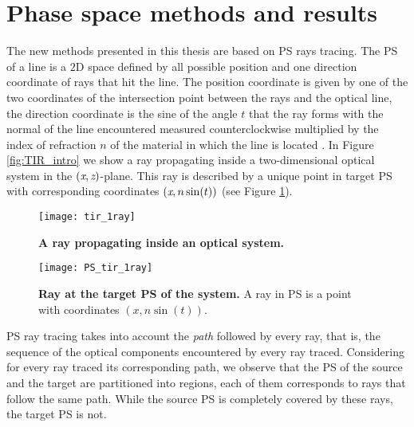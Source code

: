 \section{Phase space methods and results}
The new methods presented in this thesis are based on PS rays tracing. The PS of a line is a $2$D space defined by all possible position and one direction coordinate of rays that hit the line. 
The position coordinate is given by one of the two coordinates of the intersection point between the rays and the optical line, the direction coordinate is the sine of the angle $t$ that the ray forms with the normal of the line encountered measured counterclockwise multiplied by the index of refraction $n$ of the material in which the line is located \cite{wolf2004geometric}. In Figure \ref{fig:TIR_intro} we show a ray propagating inside a two-dimensional optical system in the $(\textit{x}, \textit{z})$-plane. This ray is described by a unique point in target PS with corresponding coordinates $(\textit{x}, n\sin(t))$ (see Figure \ref{fig:PS_intro}).
\begin{figure}[t]
  \begin{minipage}[t]{0.49\textwidth}
    \texttt{[image: tir\_1ray]}
    \caption{\textbf{A ray propagating inside an optical system.}}
    \label{fig:TIR_intro}
  \end{minipage}
\hfill
  \begin{minipage}[t]{0.49\textwidth}
    \texttt{[image: PS\_tir\_1ray]}
  \caption{\textbf{Ray at the target PS of the system.} A ray in PS is a point with coordinates $(x, n\sin(t))$.}
\label{fig:PS_intro}
 \end{minipage}
\end{figure}
PS ray tracing takes into account the \textit{path} followed by every ray, that is, the sequence of the optical components encountered by every ray traced.
Considering for every ray traced its corresponding path, we observe that the PS of the source and the target are partitioned into regions, each of them corresponds to rays that follow the same path. 
While the source PS is completely covered by these rays, the target PS is not.


